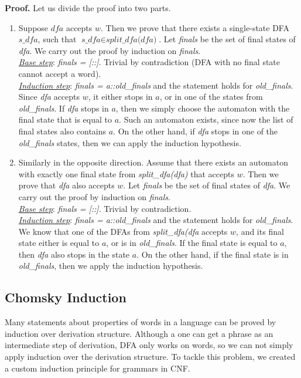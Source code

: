 \textbf{Proof.}
Let us divide the proof into two parts.
\begin{enumerate}
\item Suppose $\textit{dfa}$ accepts $w$. Then we prove that there exists a single-state DFA $\textit{s\_dfa}$, such that $\textit{s\_dfa} \in \textit{split\_dfa(dfa)}$. 
Let \textit{finals} be the set of final states of \textit{dfa}. We carry out the proof by induction on \textit{finals}. 
\\
\textit{\underline{Base step}}: \textit{finals = [::]}. Trivial by contradiction (DFA with no final state cannot accept a word).
\\
\textit{\underline{Induction step}}: \textit{finals = a::old\_finals} and the statement holds for \textit{old\_finals}. Since \textit{dfa} accepts $w$, it either stops in $a$, or in one of the states from \textit{old\_finals}.
If \textit{dfa} stops in $a$, then we simply choose the automaton with the final state that is equal to $a$.
Such an automaton exists, since now the list of final states also contains $a$.
On the other hand, if \textit{dfa} stops in one of the \textit{old\_finals} states, then we can apply the induction hypothesis.

\item Similarly in the opposite direction. Assume that there exists an automaton with exactly one final state from \textit{split\_dfa(dfa)} that accepts $w$. Then we prove that \textit{dfa} also accepts $w$. 
Let \textit{finals} be the set of final states of \textit{dfa}. We carry out the proof by induction on \textit{finals}. 
\\
\textit{\underline{Base step}}: \textit{finals = [::]}. Trivial by contradiction.
\\
\textit{\underline{Induction step}}: \textit{finals = a::old\_finals} and the statement holds for \textit{old\_finals}.
We know that one of the DFAs from \textit{split\_dfa(dfa} accepts $w$, and its final state either is equal to $a$, or is in \textit{old\_finals}.
If the final state is equal to $a$, then \textit{dfa} also stops in the state $a$.
On the other hand, if the final state is in \textit{old\_finals}, then we apply the induction hypothesis.
\end{enumerate}


\subsection{Chomsky Induction}
\label{sec:chomsky-induction}

Many statements about properties of words in a language can be proved by induction over derivation structure.
Although a one can get a phrase as an intermediate step of derivation, DFA only works on words, so we can not simply apply induction over the derivation structure. To tackle this problem, we created a custom induction principle for grammars in CNF.

